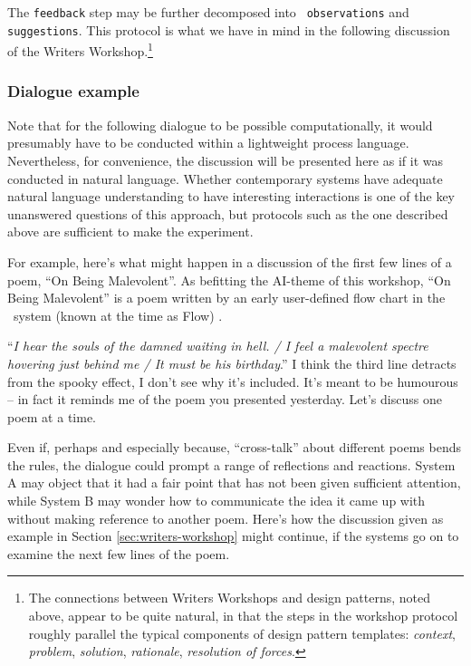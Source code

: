 The {\tt feedback} step may be further decomposed into {\tt
  observations} and {\tt suggestions}.  This protocol is what we have
in mind in the following discussion of the Writers
Workshop.\footnote{The connections between Writers Workshops and
  design patterns, noted above, appear to be quite natural, in that
  the steps in the workshop protocol roughly parallel the typical
  components of design pattern templates: \emph{context},
  \emph{problem}, \emph{solution}, \emph{rationale}, \emph{resolution
    of forces}.}

\subsubsection{Dialogue example} \label{sec:dialogue-example}
Note that for the following dialogue to be possible computationally,
it would presumably have to be conducted within a lightweight process
language.  Nevertheless, for convenience, the discussion will be
presented here as if it was conducted in natural language.  Whether
contemporary systems have adequate natural language understanding to
have interesting interactions is one of the key unanswered questions
of this approach, but protocols such as the one described above are sufficient to make the experiment.

For example, here's what might happen in a discussion of the first few
lines of a poem, ``On Being Malevolent''.  As befitting the AI-theme
of this workshop, ``On Being Malevolent'' is a poem written by an
early user-defined flow chart in the \Fw\ system (known at the time as
{\sf Flow}) \cite{colton-flowcharting}.

\begin{center}
\begin{minipage}{.9\columnwidth}
\begin{dialogue}
 ``\emph{I hear the souls of the
  damned waiting in hell. / I feel a malevolent
  spectre hovering just behind me / It must be
  his birthday}.''
%
 I think the third line detracts
from the spooky effect, I don't see why it's
included.
%
 It's meant to be humourous -- in fact it reminds me
of the poem you presented yesterday.
%
 Let's discuss one poem at a
time.
\end{dialogue}
\end{minipage}
\end{center}

Even if, perhaps and especially because, ``cross-talk'' about
different poems bends the rules, the dialogue could prompt a range of
reflections and reactions.  System A may object that it had a fair
point that has not been given sufficient attention, while System B may
wonder how to communicate the idea it came up with without making
reference to another poem.  Here's how the discussion given as example
in Section \ref{sec:writers-workshop} might continue, if the systems
go on to examine the next few lines of the poem.

